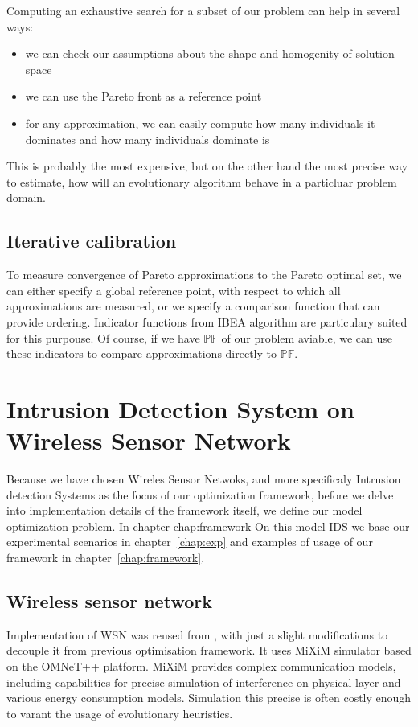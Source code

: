 \documentclass[12pt,oneside]{fithesis2}
\begin{document}
Computing an exhaustive search for a subset of our problem can help in several ways:
\begin{itemize}
  \item we can check our assumptions about the shape and homogenity of solution space
  \item we can use the Pareto front as a reference point
  \item for any approximation, we can easily compute how many individuals it dominates and how many individuals dominate is
\end{itemize}

This is probably the most expensive, but on the other hand the most precise way to estimate, how will an evolutionary algorithm behave in a particluar problem domain.

\section{Iterative calibration}

To measure convergence of Pareto approximations to the Pareto optimal set, we can either specify a global reference point, with respect to which all approximations are measured, or we specify a comparison function that can provide ordering. Indicator functions from IBEA algorithm are particulary suited for this purpouse. Of course, if we have $\mathbb{PF}$ of our problem aviable, we can use these indicators to compare approximations directly to $\mathbb{PF}$.

\chapter{Intrusion Detection System on Wireless Sensor Network}

Because we have chosen Wireles Sensor Netwoks, and more specificaly Intrusion detection Systems as the focus of our optimization framework, before we delve into implementation details of the framework itself, we define our model optimization problem.
In chapter chap:framework On this model IDS we base our experimental scenarios in chapter~\ref{chap:exp} and examples of usage of our framework in chapter~\ref{chap:framework}.

\section{Wireless sensor network}
Implementation of WSN was reused from \cite{Stetsko12}, with just a slight modifications to decouple it from previous optimisation framework. It uses MiXiM simulator based on the OMNeT++ platform. MiXiM provides complex communication models, including capabilities for precise simulation of interference on physical layer and various energy consumption models. Simulation this precise is often costly enough to varant the usage of evolutionary heuristics.
\end{document}
